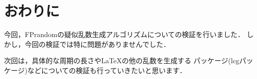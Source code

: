 \section{おわりに}
今回，FPrandomの疑似乱数生成アルゴリズムについての検証を行いました．
しかし，今回の検証では特に問題がありませんでした．

次回は，具体的な周期の長さや\LaTeX の他の乱数を生成する
パッケージ(lcgパッケージ)などについての検証も行っていきたいと思います．
